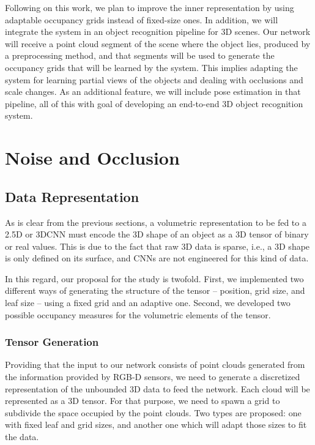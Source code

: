 Following on this work, we plan to improve the inner representation by using adaptable occupancy grids instead of fixed-size ones. In addition, we will integrate the system in an object recognition pipeline for 3D scenes. Our network will receive a point cloud segment of the scene where the object lies, produced by a preprocessing method, and that segments will be used to generate the occupancy grids that will be learned by the system. This implies adapting the system for learning partial views of the objects and dealing with occlusions and scale changes. As an additional feature, we will include pose estimation in that pipeline, all of this with goal of developing an end-to-end 3D object recognition system.

\section{Noise and Occlusion}
\label{cha:objrecog:sec:study}


\subsection{Data Representation}
\label{cha:objrecog:sec:study:subsec:representation}

As is clear from the previous sections, a volumetric representation to be fed to a \acs{2.5D} or \acs{3D}\acs{CNN} must encode the \acs{3D} shape of an object as a \acs{3D} tensor of binary or real values. This is due to the fact that raw \acs{3D} data is sparse, i.e., a \acs{3D} shape is only defined on its surface, and \acp{CNN} are not engineered for this kind of data.

In this regard, our proposal for the study is twofold. First, we implemented two different ways of generating the structure of the tensor -- position, grid size, and leaf size -- using a fixed grid and an adaptive one. Second, we developed two possible occupancy measures for the volumetric elements of the tensor.

\subsubsection{Tensor Generation}
\label{cha:objrecog:sec:study:subsec:representation:subsubsec:tensor}

Providing that the input to our network consists of point clouds generated from the information provided by \acs{RGB-D} sensors, we need to generate a discretized representation of the unbounded \acs{3D} data to feed the network. Each cloud will be represented as a \acs{3D} tensor. For that purpose, we need to spawn a grid to subdivide the space occupied by the point clouds. Two types are proposed: one with fixed leaf and grid sizes, and another one which will adapt those sizes to fit the data.

